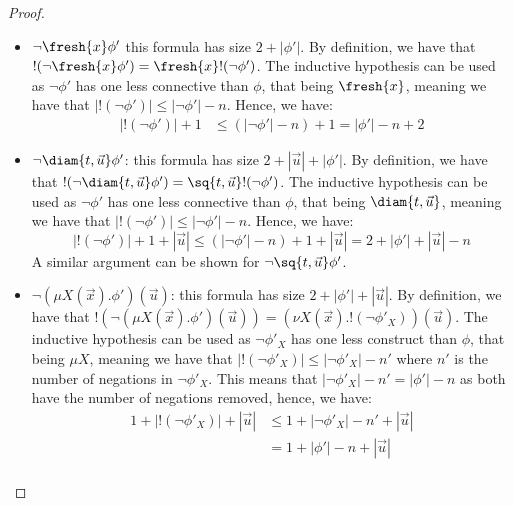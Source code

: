 \begin{proof}
\begin{itemize}
		By definition, we have that $!(\lnot \bigvee\nolimits_x \phi') = \bigwedge\nolimits_x !(\lnot \phi')$. 
		The inductive hypothesis can be used as $\lnot \phi'$ has one less connective than $\phi$, that being $\bigvee\nolimits_x$, meaning
		we have that $|!(\lnot \phi')| \le |\lnot \phi'| - n$.
		Hence, we have:
		\begin{align*}
			|!(\lnot \phi')| + 1 &\le (|\lnot \phi'| - n) + 1= |\phi'| - n + 2
		\end{align*}    
		A similar argument can be shown for $\lnot\bigwedge\nolimits_x \phi'$.
        \item $\lnot \fresh{x}\phi'$ this formula has size $2 + |\phi'|$. 
		By definition, we have that $!(\lnot \fresh{x} \phi') = \fresh{x}!(\lnot \phi')$. 
		The inductive hypothesis can be used as $\lnot \phi'$ has one less connective than $\phi$, that being $\fresh{x}$, meaning
		we have that $|!(\lnot \phi')| \le |\lnot \phi'| - n$.
		Hence, we have:
		\begin{align*}
			|!(\lnot \phi')| + 1 &\le (|\lnot \phi'| - n) + 1= |\phi'| - n + 2
		\end{align*}
		\item $\lnot \diam{t, \vec u} \phi'$: 
		this formula has size $2 + |\vec u| + |\phi'|$. 
		By definition, we have that $!(\lnot\diam{t, \vec u}\phi') = \sq{t, \vec u}!(\lnot \phi')$.
		The inductive hypothesis can be used as $\lnot \phi'$ has one less connective than $\phi$, that being $\diam{t, \vec u}$, meaning we have that $|!(\lnot \phi')| \le |\lnot \phi'| - n$. 
		Hence, we have:
		\[
		|!(\lnot \phi')| + 1 + |\vec u| \le (|\lnot \phi'| - n) + 1 + |\vec u| = 2 + |\phi'| + |\vec u| - n 
		\]
		A similar argument can be shown for $\lnot\sq{t, \vec u}\phi'$.
		\item $\lnot (\mu X(\vec x).\phi')(\vec u)$: this formula has size $2 + |\phi'| + |\vec u|$. 
		By definition, we have that $!(\lnot (\mu X(\vec x).\phi')(\vec u)) = (\nu X(\vec x).!(\lnot \phi'_X))(\vec u)$.
		The inductive hypothesis can be used as $\lnot \phi'_X$ has one less construct than $\phi$, that being $\mu X$, meaning
		we have that $|!(\lnot\phi'_X)| \leq |\lnot \phi'_X| - n'$ where $n'$ is the number of negations in $\lnot \phi'_X$.
		This means that $|\lnot \phi'_X| - n' = |\phi'| - n$ as both have the number of negations removed,
		hence, we have:
		\begin{align*}
			1 + |!(\lnot \phi'_X)| + |\vec u| &\le 1 + |\lnot \phi'_X| - n' + |\vec u| \\
			&= 1 + |\phi'| - n + |\vec u|\\

\end{align*}
\end{itemize}
\end{proof}
